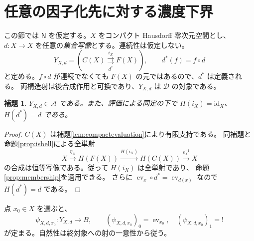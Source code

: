 \documentclass[a4paper,11pt]{ltjsarticle}
\theoremstyle{japaneseplain}
\newtheorem{lemma}[theorem]{補題}
\newcommand{\D}{\mathcal D}
\newcommand{\A}{\mathcal A}
\newcommand{\Naxiom}{\mathsf N}
\newcommand{\id}{\mathrm{id}}
\newcommand{\ev}{\operatorname{ev}}
\newcommand{\pairarrows}[2]{\mathrel{\mathop{\rightrightarrows}\limits^{#1}_{#2}}}
\begin{document}
\section{任意の因子化先に対する濃度下界}\label{sec:bound}

この節では $\Naxiom$ を仮定する。$X$ をコンパクト Hausdorff 零次元空間とし、
$d:X\to X$ を任意の\emph{集合写像}とする。連続性は仮定しない。
\begin{equation}\label{eq:Y}
 Y_{X,d}=(C(X)\pairarrows{i_X}{d^*}F(X)),
 \qquad d^*(f)=f\circ d
\end{equation}
と定める。$f\circ d$ が連続でなくても $F(X)$ の元ではあるので、$d^*$ は定義される。
両構造射は後合成作用と可換であり、$Y_{X,d}$ は $\D$ の対象である。

\begin{lemma}\label{lem:Ymembership}
$Y_{X,d}\in\A$ である。また、評価による同定の下で $H(i_X)=\id_X$、$H(d^*)=d$ である。
\end{lemma}
\begin{proof}
$C(X)$ は補題\ref{lem:compactevaluation}により有限支持である。
同補題と命題\ref{prop:isbell}による全単射
\[
 X\xrightarrow{\eta_X}H(F(X))
 \xrightarrow{H(i_X)}H(C(X))\xrightarrow{\epsilon_X^{-1}}X
\]
の合成は恒等写像である。従って $H(i_X)$ は全単射であり、
命題\ref{prop:membership}を適用できる。
さらに $\ev_x\circ d^*=\ev_{d(x)}$ なので $H(d^*)=d$ である。
\end{proof}

点 $x_0\in X$ を選ぶと、
\begin{equation}\label{eq:psi}
 \psi_{X,d,x_0}:Y_{X,d}\longrightarrow B,
 \qquad (\psi_{X,d,x_0})_0=\ev_{x_0},\quad
 (\psi_{X,d,x_0})_1=!
\end{equation}
が定まる。自然性は終対象への射の一意性から従う。
\end{document}
